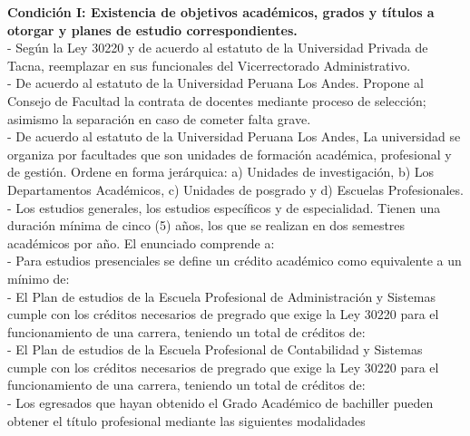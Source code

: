 \textbf{Condición I: Existencia de objetivos académicos, grados y títulos a otorgar y planes de estudio correspondientes.}\\
-	Según la Ley 30220 y de acuerdo al estatuto de la Universidad Privada de Tacna, reemplazar en sus funcionales del Vicerrectorado Administrativo.\\
-	De acuerdo al estatuto de la Universidad Peruana Los Andes. Propone al Consejo de Facultad la contrata de docentes mediante proceso de selección; 		asimismo la separación en caso de cometer falta grave.\\
-	De acuerdo al estatuto de la Universidad Peruana Los Andes, La universidad se organiza por facultades que son unidades de formación académica, 		profesional y de gestión. Ordene en forma jerárquica: a) Unidades de investigación, b) Los Departamentos Académicos, c) Unidades de posgrado y d) 		Escuelas Profesionales.\\
-	Los estudios generales, los estudios específicos y de especialidad. Tienen una duración mínima de cinco (5) años, los que se realizan en dos semestres     	académicos por año. El enunciado comprende a:\\
-	Para estudios presenciales se define un crédito académico como equivalente a un mínimo de:\\
-	El Plan de estudios de la Escuela Profesional de Administración y Sistemas cumple con los créditos necesarios de pregrado que exige la Ley 30220 para 		el funcionamiento de una carrera, teniendo un total de créditos de: \\
-	El Plan de estudios de la Escuela Profesional de Contabilidad y Sistemas cumple con los créditos necesarios de pregrado que exige la Ley 30220 para el 		funcionamiento de una carrera, teniendo un total de créditos de:\\
-	Los egresados que hayan obtenido el Grado Académico de bachiller pueden obtener el título profesional mediante las siguientes modalidades\\




